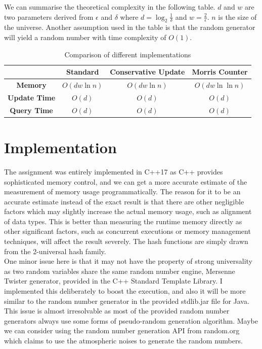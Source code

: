 \documentclass[a4paper, 11pt]{article}
\begin{document}
        \noindent We can summarise the theoretical complexity in the following table. $d$ and $w$ are two parameters derived from $\epsilon$ and $\delta$ where $d = \log_{2}{\frac{1}{\delta}}$ and $w = \frac{2}{\epsilon}$. $n$ is the size of the universe. Another assumption used in the table is that the random generator will yield a random number with time complexity of $O(1)$.
        \begin{table}[!h]
            \centering
            \begin{tabular}{|c|c|c|c|}
                \hline
                                     & \textbf{Standard} & \textbf{Conservative Update} & \textbf{Morris Counter} \\
                \hline
                \textbf{Memory}      & $O(dw\ln{n})$     & $O(dw\ln{n})$                & $O(dw\ln{\ln{n}})$      \\
                \hline
                \textbf{Update Time} & $O(d)$            & $O(d)$                       & $O(d)$                  \\
                \hline
                \textbf{Query Time}  & $O(d)$            & $O(d)$                       & $O(d)$                  \\
                \hline
            \end{tabular}
            \caption{Comparison of different implementations}
            \label{table:comparison}
        \end{table}
    \section{Implementation}
        The assignment was entirely implemented in C++17 as C++ provides sophisticated memory control, and we can get a more accurate estimate of the measurement of memory usage programmatically. The reason for it to be an accurate estimate instead of the exact result is that there are other negligible factors which may slightly increase the actual memory usage, such as alignment of data types. This is better than measuring the runtime memory directly as other significant factors, such as concurrent executions or memory management techniques, will affect the result severely. The hash functions are simply drawn from the 2-universal hash family. \\

        \noindent One minor issue here is that it may not have the property of strong universality as two random variables share the same random number engine, Mersenne Twister generator, provided in the C++ Standard Template Library. I implemented this deliberately to boost the execution, and also it will be more similar to the random number generator in the provided stdlib.jar file for Java. This issue is almost irresolvable as most of the provided random number generators always use some forms of pseudo-random generation algorithm. Maybe we can consider using the random number generation API from random.org which claims to use the atmospheric noises to generate the random numbers. \\
\end{document}
